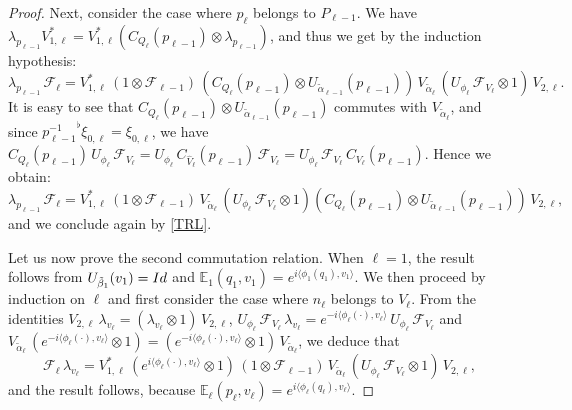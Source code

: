 \documentclass[10pt,a4paper]{amsart}
\newcommand{\E}{\mathbb E}
\newcommand{\F}{{\mathcal F}}
\begin{document}
\begin{proof}
Next, consider the case where  $p_\ell$ belongs to $P_{\ell-1}$.  We have
$\lambda_{p_{\ell-1}}V_{1,\ell}^*=V_{1,\ell}^*(C_{Q_\ell}(p_{\ell-1})\otimes \lambda_{p_{\ell-1}})$,
and thus we get by the induction hypothesis:
$$
\lambda_{p_{\ell-1}}\,\F_\ell=V_{1,\ell}^*\,(1\otimes \F_{\ell-1})\, (C_{Q_\ell}(p_{\ell-1})\otimes U_{\tilde\alpha_{\ell-1}}(p_{\ell-1}))\,
 V_{\tilde\alpha_\ell} \,( U_{\phi_\ell}\,\F_{V_\ell}\otimes 1)\,V_{2,\ell}.
$$
It is easy to see that  $ C_{Q_\ell} (p_{\ell-1})\otimes U_{\tilde\alpha_{\ell-1}}(p_{\ell-1})$ commutes with
$ V_{\tilde\alpha_\ell} $, and since ${p_{\ell-1}^{-1}}^\flat\xi_{0,\ell}=\xi_{0,\ell}$, we have
$ C_{Q_\ell} (p_{\ell-1})\, U_{\phi_\ell}\,\F_{V_\ell}= U_{\phi_\ell}\, C_{\hat V_\ell} (p_{\ell-1})\,\F_{V_\ell}= U_{\phi_\ell}\,\F_{V_\ell}\, C_{V_\ell}(p_{\ell-1})$. Hence we obtain:
 $$
\lambda_{p_{\ell-1}}\,\F_\ell=V_{1,\ell}^*\,(1\otimes \F_{\ell-1})\,
 V_{\tilde\alpha_\ell} \,( U_{\phi_\ell}\,\F_{V_\ell}\otimes 1)( C_{Q_\ell} (p_{\ell-1})\otimes U_{\tilde\alpha_{\ell-1}}(p_{\ell-1}))\,V_{2,\ell},
$$
and we conclude again by \eqref{TRL}.

\smallskip

 Let us now prove the second commutation relation. When $\ell=1$, the result follows  from
$U_{\tilde \beta_1}(v_1)={\rm Id}$ and $\E_1(q_1,v_1)=e^{i\langle\phi_1(q_1),v_1\rangle}$. We then proceed by induction on $\ell$ and first consider the case where
 $n_\ell$ belongs to $V_\ell$. From the identities $V_{2,\ell}\,\lambda_{v_\ell}=(\lambda_{v_\ell}\otimes 1)\,V_{2,\ell}$,
$ U_{\phi_\ell}\,\F_{V_\ell}\,\lambda_{v_\ell}= e^{-i\langle\phi_\ell(\cdot),v_\ell\rangle}\, U_{\phi_\ell}\,\F_{V_\ell}$
and $ V_{\tilde\alpha_\ell} \,(e^{-i\langle\phi_\ell(\cdot),v_\ell\rangle}\otimes 1)=(e^{-i\langle\phi_\ell(\cdot),v_\ell\rangle}\otimes 1)\,  V_{\tilde\alpha_\ell} $,
we deduce that
$$
\F_\ell\,\lambda_{v_\ell}=V_{1,\ell}^*\,(e^{i\langle\phi_\ell(\cdot),v_\ell\rangle}\otimes 1)\,(1\otimes \F_{\ell-1})\, V_{\tilde\alpha_\ell} \,( U_{\phi_\ell}\,\F_{V_\ell}\otimes 1)\,V_{2,\ell},
$$
and the result follows, because  $\E_\ell(p_\ell, v_\ell)=e^{i\langle\phi_\ell(q_\ell),v_\ell\rangle}$.


\end{proof}
\end{document}
